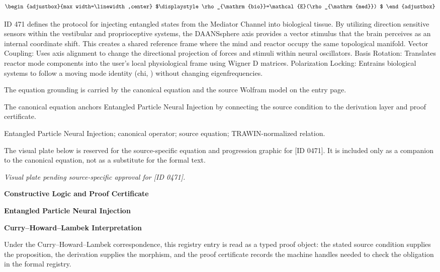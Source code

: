 \[
\begin{adjustbox}{max width=\linewidth,center}
$\displaystyle
\rho_{\mathrm{bio}}=\mathcal{E}(\rho_{\mathrm{med}})
$
\end{adjustbox}
\]

ID 471 defines the protocol for injecting entangled states from the Mediator Channel into biological tissue. By utilizing direction sensitive sensors within the vestibular and proprioceptive systems, the DAANSsphere axis provides a vector stimulus that the brain perceives as an internal coordinate shift. This creates a shared reference frame where the mind and reactor occupy the same topological manifold. Vector Coupling: Uses axis alignment to change the directional projection of forces and stimuli within neural oscillators. Basis Rotation: Translates reactor mode components into the user's local physiological frame using Wigner D matrices. Polarization Locking: Entrains biological systems to follow a moving mode identity (chi, ) without changing eigenfrequencies.

The equation grounding is carried by the canonical equation and the source Wolfram model on the entry page.

The canonical equation anchors Entangled Particle Neural Injection by connecting the source condition to the derivation layer and proof certificate.

Entangled Particle Neural Injection; canonical operator; source equation; TRAWIN-normalized relation.
\endgroup

\begingroup\footnotesize\sloppy
The visual plate below is reserved for the source-specific equation and progression graphic for [ID 0471]. It is included only as a companion to the canonical equation, not as a substitute for the formal text.
\par\endgroup
\begingroup\footnotesize\itshape
Visual plate pending source-specific approval for [ID 0471].
\par\endgroup

\clearpage
\begingroup\tzpsupportsetup
\noindent\textbf{\fontsize{10.8pt}{12.8pt}\selectfont [ID 0471] Constructive Logic and Proof Certificate}\par
\noindent\textbf{\fontsize{10pt}{12pt}\selectfont Entangled Particle Neural Injection}\par
\vspace{0.45em}
\begingroup
\footnotesize
\setlength{\parskip}{0.22em}
\setlength{\parindent}{0pt}
\noindent\textbf{Curry--Howard--Lambek Interpretation}\par
Under the Curry--Howard--Lambek correspondence, this registry entry is read as a typed proof
object: the stated source condition supplies the proposition, the derivation supplies the
morphism, and the proof certificate records the machine handles needed to check the obligation
in the formal registry.

